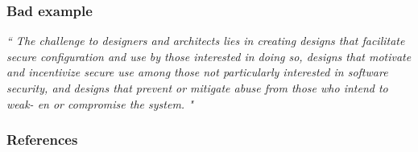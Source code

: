 \documentclass[12pt,norsk]{beamer}
\begin{document}
\begin{frame}
\frametitle{Bad example}

\textit{ `` The challenge to designers and architects lies in creating designs that facilitate secure configuration and use by those interested in doing so, designs that motivate and incentivize secure use among those not particularly interested in software security, and designs that prevent or mitigate abuse from those who intend to weak- en or compromise the system. "}

\end{frame}

\begin{frame}

	\frametitle{References}
		
	
		

\end{frame}




\end{document}
